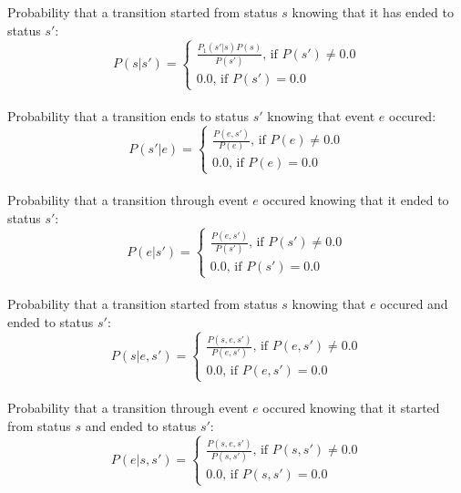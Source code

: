 \documentclass[12pt, a4paper]{article}
\begin{document}
Probability that a transition started from status $s$ knowing that it has ended to status $s'$:\\
\begin{equation}
P(s|s')=
\left\lbrace
\begin{array}{l}
\frac{P_1(s'|s)P(s)}{P(s')}\textrm{, if }P(s') \neq 0.0\\
0.0\textrm{, if }P(s') = 0.0
\end{array}
\right.
\end{equation}\\

Probability that a transition ends to status $s'$ knowing that event $e$ occured:\\
\begin{equation}
P(s'|e)=
\left\lbrace
\begin{array}{l}
\frac{P(e,s')}{P(e)}\textrm{, if }P(e) \neq 0.0\\
0.0\textrm{, if }P(e) = 0.0
\end{array}
\right.
\end{equation}\\

Probability that a transition through event $e$ occured knowing that it ended to status $s'$:\\
\begin{equation}
P(e|s')=
\left\lbrace
\begin{array}{l}
\frac{P(e,s')}{P(s')}\textrm{, if }P(s') \neq 0.0\\
0.0\textrm{, if }P(s') = 0.0
\end{array}
\right.
\end{equation}\\

Probability that a transition started from status $s$ knowing that $e$ occured and ended to status $s'$:\\
\begin{equation}
P(s|e,s')=
\left\lbrace
\begin{array}{l}
\frac{P(s,e,s')}{P(e,s')}\textrm{, if }P(e,s') \neq 0.0\\
0.0\textrm{, if }P(e,s') = 0.0
\end{array}
\right.
\end{equation}\\

Probability that a transition through event $e$ occured knowing that it started from status $s$ and ended to status $s'$:\\
\begin{equation}
P(e|s,s')=
\left\lbrace
\begin{array}{l}
\frac{P(s,e,s')}{P(s,s')}\textrm{, if }P(s,s') \neq 0.0\\
0.0\textrm{, if }P(s,s') = 0.0
\end{array}
\right.
\end{equation}\\
\end{document}
